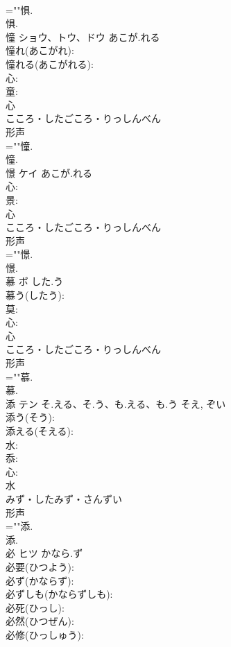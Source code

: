 \documentclass[8pt]{extreport}
\begin{document}
\begin{CJK}{UTF8}{min}
\\	=""惧.
\\	惧.
\\	憧	ショウ、トウ、ドウ	あこが.れる		
\\	憧れ(あこがれ): 
\\	憧れる(あこがれる): 
\\	心: 
\\	童: 
\\	心	
\\	こころ・したごころ・りっしんべん	
\\	形声 
\\	=""憧.
\\	憧.
\\	憬	ケイ	あこが.れる		
\\	心: 
\\	景: 
\\	心	
\\	こころ・したごころ・りっしんべん	
\\	形声 
\\	=""憬.
\\	憬.
\\	慕	ボ	した.う		
\\	慕う(したう): 
\\	莫: 
\\	心: 
\\	心	
\\	こころ・したごころ・りっしんべん	
\\	形声 
\\	=""慕.
\\	慕.
\\	添	テン	そ.える、そ.う、も.える、も.う	そえ, ぞい	
\\	添う(そう): 
\\	添える(そえる): 
\\	水: 
\\	忝: 
\\	心: 
\\	水	
\\	みず・したみず・さんずい	
\\	形声 
\\	=""添.
\\	添.
\\	必	ヒツ	かなら.ず		
\\	必要(ひつよう): 
\\	必ず(かならず): 
\\	必ずしも(かならずしも): 
\\	必死(ひっし): 
\\	必然(ひつぜん): 
\\	必修(ひっしゅう): 

\end{CJK}
\end{document}
